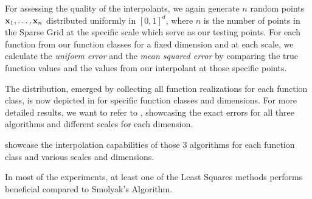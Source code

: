\documentclass[12pt, oneside]{amsart}
\theoremstyle{definition}
\theoremstyle{remark}
\numberwithin{equation}{section}
\begin{document}
For assessing the quality of the interpolants, we again generate $n$ random 
points $\mathbf{x}_1, \ldots, \mathbf{x}_n$ distributed uniformly in $[0,1]^d$, where $n$ 
is the number of points in the Sparse Grid at the specific scale which serve as 
our testing points. For each function from our function classes for a fixed 
dimension and at each scale, we calculate 
the \emph{uniform error} and the \emph{mean squared error} by comparing the 
true function values and the values from our interpolant at those specific 
points.

The distribution, emerged by collecting all function realizations for each 
function class, is now depicted in 
 for specific 
function classes and dimensions. For more detailed results, we want to refer to 
, showcasing the exact errors 
for all three algorithms and different scales for each dimension.


 showcase the interpolation 
capabilities of those 3 algorithms for each function class and various scales 
and dimensions. 




In most of the experiments, at least one of the Least Squares methods 
performs beneficial compared to Smolyak's Algorithm. 



\end{document}
